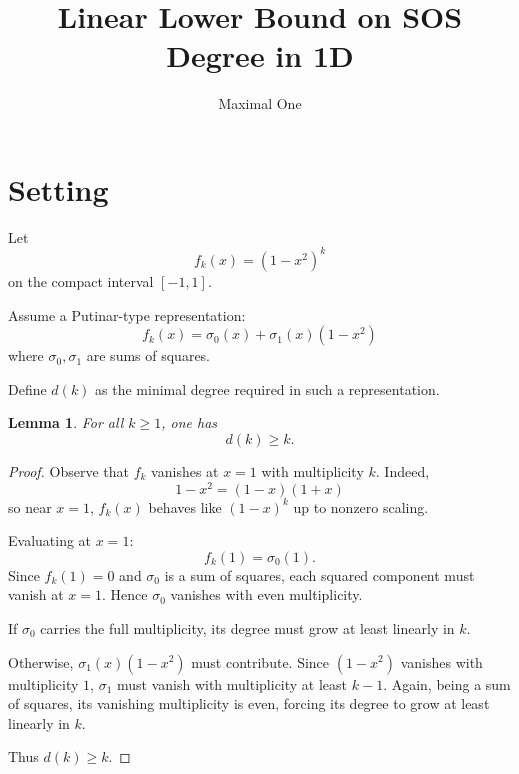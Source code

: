 \documentclass{article}
\newtheorem{lemma}{Lemma}
\begin{document}
\title{Linear Lower Bound on SOS Degree in 1D}
\author{Maximal One}
\date{}
\maketitle

\section*{Setting}

Let
\[
f_k(x) = (1 - x^2)^k
\]
on the compact interval $[-1,1]$.

Assume a Putinar-type representation:
\[
f_k(x) = \sigma_0(x) + \sigma_1(x)(1 - x^2)
\]
where $\sigma_0, \sigma_1$ are sums of squares.

Define $d(k)$ as the minimal degree required in such a representation.

\begin{lemma}
For all $k \ge 1$, one has
\[
d(k) \ge k.
\]
\end{lemma}

\begin{proof}
Observe that $f_k$ vanishes at $x=1$ with multiplicity $k$.
Indeed,
\[
1 - x^2 = (1-x)(1+x)
\]
so near $x=1$, $f_k(x)$ behaves like $(1-x)^k$ up to nonzero scaling.

Evaluating at $x=1$:
\[
f_k(1) = \sigma_0(1).
\]
Since $f_k(1)=0$ and $\sigma_0$ is a sum of squares,
each squared component must vanish at $x=1$.
Hence $\sigma_0$ vanishes with even multiplicity.

If $\sigma_0$ carries the full multiplicity,
its degree must grow at least linearly in $k$.

Otherwise,
$\sigma_1(x)(1-x^2)$ must contribute.
Since $(1-x^2)$ vanishes with multiplicity $1$,
$\sigma_1$ must vanish with multiplicity at least $k-1$.
Again, being a sum of squares,
its vanishing multiplicity is even,
forcing its degree to grow at least linearly in $k$.

Thus $d(k) \ge k$.
\end{proof}
\end{document}
